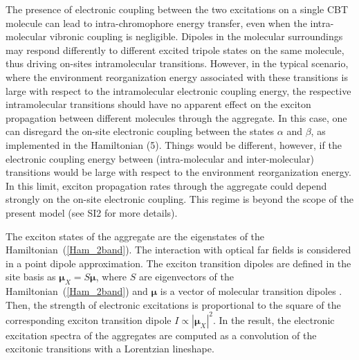 \documentclass[journal=jacs,manuscript=article]{achemso}
\begin{document}
The presence of electronic coupling between the two excitations on a single CBT molecule can lead to intra-chromophore energy transfer, even when the intra-molecular vibronic coupling is negligible. Dipoles in the molecular surroundings may respond differently to different excited tripole states on the same molecule, thus driving on-sites intramolecular transitions. However, in the typical scenario, where the environment reorganization energy associated with these transitions is large with respect to the intramolecular electronic coupling energy, the respective intramolecular transitions should have no apparent effect on the exciton propagation between different molecules through the aggregate. In this case, one can disregard the on-site electronic coupling between the states $\alpha$  and $\beta$, as implemented in the Hamiltonian (5). Things would be different, however, if the electronic coupling energy between (intra-molecular and inter-molecular) transitions would be large with respect to the environment reorganization energy. In this limit, exciton propagation rates through the aggregate could depend strongly on the on-site electronic coupling. This regime is beyond the scope of the present model (see SI2 for more details).

The exciton states of the aggregate are the eigenstates of the Hamiltonian~(\ref{Ham_2band}). The interaction with optical far fields is considered in a point dipole approximation. The exciton transition dipoles are defined in the site basis as $\mathbf{\mu}_X = S \mathbf{\mu} $, where $S$ are eigenvectors of the Hamiltonian~(\ref{Ham_2band}) and $\mathbf{\mu}$ is a vector of molecular transition dipoles \cite{Valleau_ACS2014}. Then, the strength of electronic excitations is proportional to the square of the corresponding exciton transition dipole $I\propto |\mathbf{\mu}_X|^2$. In the result, the electronic excitation spectra of the aggregates are computed as a convolution of the excitonic transitions with a Lorentzian lineshape.
\end{document}
